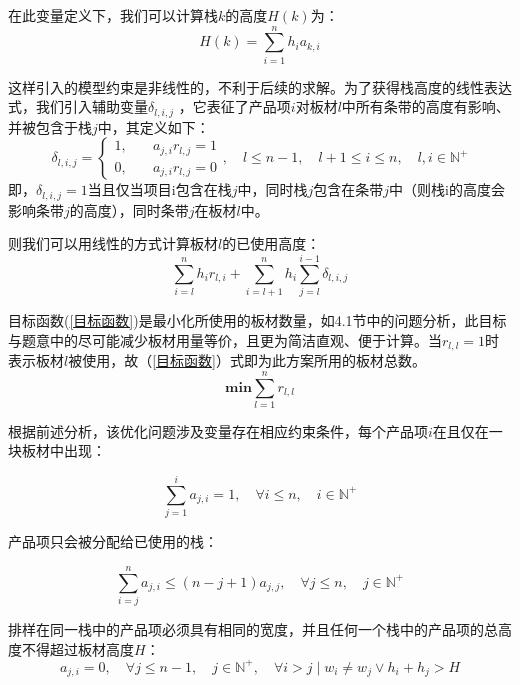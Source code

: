 \documentclass[bwprint]{gmcmthesis}
\begin{document}
在此变量定义下，我们可以计算栈$k$的高度$H(k)$为：
\begin{equation}
    H(k)=\sum_{i=1}^{n} h_i a_{k,i}
\end{equation}


这样引入的模型约束是非线性的，不利于后续的求解。为了获得栈高度的线性表达式，我们引入辅助变量$\delta_{l,i,j}$ ，它表征了产品项$i$对板材$l$中所有条带的高度有影响、并被包含于栈$j$中，其定义如下：
\begin{equation}
    \delta_{l,i,j}=  
    \begin{cases}
        1, \quad  & a_{j,i} r_{l,j}=1\\
        0, \quad  & a_{j,i} r_{l,j}=0
    \end{cases},\quad l \le n-1 ,\quad l+1\le i \le n,\quad l,i \in \mathbb{N}^+ 
\end{equation}
即，$\delta_{l,i,j} = 1$当且仅当项目i包含在栈$j$中，同时栈$j$包含在条带$j$中（则栈i的高度会影响条带$j$的高度），同时条带$j$在板材$l$中。

则我们可以用线性的方式计算板材$l$的已使用高度：
\begin{equation}
\sum_{i=l}^{n} h_i r_{l,i}+\sum_{i=l+1}^{n} h_i \sum_{j=l}^{i-1} \delta_{l,i,j}
\end{equation}

目标函数(\ref{目标函数})是最小化所使用的板材数量，如4.1节中的问题分析，此目标与题意中的尽可能减少板材用量等价，且更为简洁直观、便于计算。当$ r_{l,l}=1 $时表示板材$l$被使用，故（\ref{目标函数}）式即为此方案所用的板材总数。
\begin{equation}
    \mathbf{min}  \sum_{l=1}^{n}  r_{l,l} \label{目标函数}
 \end{equation}


根据前述分析，该优化问题涉及变量存在相应约束条件，每个产品项$i$在且仅在一块板材中出现：

\begin{equation}
    \sum_{j=1}^{i}  a_{j,i} =1,\quad \forall i \le n,\quad i \in \mathbb{N}^+ \label{产品项必须排}
\end{equation}


产品项只会被分配给已使用的栈：

\begin{equation}
   \sum_{i=j}^{n}  a_{j,i} \le (n-j+1)a_{j,j},\quad \forall j \le n,\quad j \in \mathbb{N}^+  \label{产品项只给已使用栈}
\end{equation}

排样在同一栈中的产品项必须具有相同的宽度，并且任何一个栈中的产品项的总高度不得超过板材高度$H$：
\begin{equation}
     a_{j,i}=0,\quad \forall j \le n-1,\quad j \in \mathbb{N}^+,\quad  \forall i>j \mid w_i \neq w_j \vee h_i+h_j>H \label{相同宽度}
 \end{equation}
\end{document}
